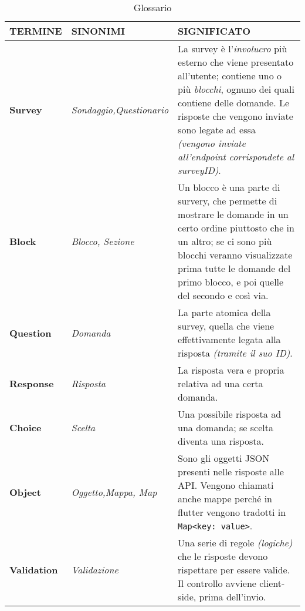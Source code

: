 \begin{table}[h!]
\centering
\def\arraystretch{1.5}
\begin{tabular}{| m{6em} | m{6em} | m{20em} |}
 \hline
 \textbf{TERMINE} & \textbf{SINONIMI} & \textbf{SIGNIFICATO} \\
 \hline \hline
 
 \textbf{Survey} &
 \textit{Sondaggio,\newline Questionario} &
 La survey è l'\textit{involucro} più esterno che viene presentato all'utente; contiene uno o più \textit{blocchi}, ognuno dei quali contiene delle domande. Le risposte che vengono inviate sono legate ad essa \textit{(vengono inviate all'endpoint corrispondete al surveyID)}. \\ 
 \hline
 
 \textbf{Block} & \textit{Blocco, \newline Sezione} & Un blocco è una parte di survery, che permette di mostrare le domande in un certo ordine piuttosto che in un altro; se ci sono più blocchi veranno visualizzate prima tutte le domande del primo blocco, e poi quelle del secondo e così via. \\ 
 \hline
 
 \textbf{Question} & \textit{Domanda} & La parte atomica della survey, quella che viene effettivamente legata alla risposta \textit{(tramite il suo ID)}. \\
 \hline
 
 \textbf{Response} & \textit{Risposta} & La risposta vera e propria relativa ad una certa domanda. \\
 \hline
 
 \textbf{Choice} & \textit{Scelta} & Una possibile risposta ad una domanda; se scelta diventa una risposta. \\
 \hline
 
 \textbf{Object} & \textit{Oggetto,\newline Mappa, Map} & Sono gli oggetti JSON presenti nelle risposte alle API. \newline Vengono chiamati anche mappe perché in flutter vengono tradotti in \texttt{Map<key: value>}. \\
 \hline
 
 \textbf{Validation} & \textit{Validazione} & Una serie di regole \textit{(logiche)} che le risposte devono rispettare per essere valide. Il controllo avviene client-side, prima dell'invio. \\
 \hline
\end{tabular}
\caption{Glossario}
\label{table:glossario}
\end{table}

